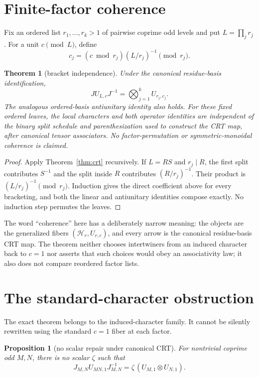 \documentclass[11pt]{article}
\newtheorem{theorem}{Theorem}
\newtheorem{proposition}{Proposition}
\begin{document}
\section{Finite-factor coherence}

Fix an ordered list $r_1,\ldots,r_k>1$ of pairwise coprime odd levels and put
$L=\prod_jr_j$.  For a unit $c\pmod L$, define
\[
 c_j=(c\bmod r_j)(L/r_j)^{-1}\pmod{r_j}.
\]

\begin{theorem}[bracket independence]\label{thm:coherence}
Under the canonical residue-basis identification,
\[
 J U_{L,c}J^{-1}=\bigotimes_{j=1}^k U_{r_j,c_j}.
\]
The analogous ordered-basis antiunitary identity also holds.  For these fixed
ordered leaves, the local characters and both operator identities are
independent of the binary split schedule and parenthesization used to construct
the CRT map, after canonical tensor associators.  No factor-permutation or
symmetric-monoidal coherence is claimed.
\end{theorem}

\begin{proof}
Apply Theorem~\ref{thm:crt} recursively.  If $L=RS$ and $r_j\mid R$, the
first split contributes $S^{-1}$ and the split inside $R$ contributes
$(R/r_j)^{-1}$.  Their product is $(L/r_j)^{-1}\pmod{r_j}$.  Induction gives
the direct coefficient above for every bracketing, and both the linear and
antiunitary identities compose exactly.  No induction step permutes the leaves.
\end{proof}

The word ``coherence'' here has a deliberately narrow meaning: the objects are
the generalized fibers $(\mathcal H_r,U_{r,c})$, and every arrow is the
canonical residue-basis CRT map.  The theorem neither chooses intertwiners from
an induced character back to $c=1$ nor asserts that such choices would obey an
associativity law; it also does not compare reordered factor lists.

\section{The standard-character obstruction}

The exact theorem belongs to the induced-character family.  It cannot be
silently rewritten using the standard $c=1$ fiber at each factor.

\begin{proposition}[no scalar repair under canonical CRT]\label{prop:obstruction}
For nontrivial coprime odd $M,N$, there is no scalar $\zeta$ such that
\[
 J_{M,N}U_{MN,1}J_{M,N}^{-1}
 =\zeta\,(U_{M,1}\otimes U_{N,1}).
\]
\end{proposition}
\end{document}

